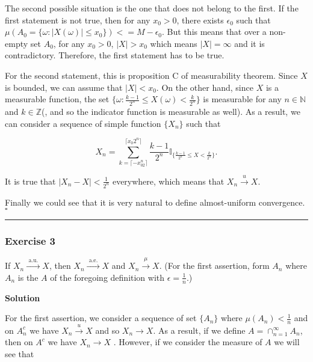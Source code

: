 \documentclass[
]{article}
\begin{document}
The second possible situation is the one that does not belong to the
first. If the first statement is not true, then for any \(x_0 > 0\),
there exists \(\epsilon_0\) such that
\(\mu(A_0 = \{\omega: |X(\omega)| \le x_0\}) <= M - \epsilon_0\). But
this means that over a non-empty set \(A_0\), for any \(x_0 > 0\),
\(|X| > x_0\) which means \(|X| = \infty\) and it is contradictory.
Therefore, the first statement has to be true.

For the second statement, this is proposition
C\textquotesingle\textquotesingle{} of measurability theorem. Since
\(X\) is bounded, we can assume that \(|X| < x_0\). On the other hand,
since \(X\) is a measurable function, the set
\(\{\omega:  \frac{k-1}{2^n} \le X(\omega) < \frac{k}{2^n}\}\) is
measurable for any \(n\in \mathbb N\) and \(k \in \mathbb Z\)(, and so
the indicator function is measurable as well). As a result, we can
consider a sequence of simple function \(\{X_n\}\) such that

\[X_n = \sum_{k = \lceil -x_02^n\rceil }^{\lceil x_0 2^n \rceil } \frac{k-1}{2^n} \mathbb I_{\{\frac{k-1}{2^n} \le X < \frac{k}{2^n}\}}.\]

It is true that \(|X_n - X| < \frac{1}{2^n}\) everywhere, which means
that \(X_n \xrightarrow{u} X\).

Finally we could see that it is very natural to define almost-uniform
convergence. \(\square\)

\begin{center}\rule{0.5\linewidth}{0.5pt}\end{center}

\hypertarget{exercise-3-2}{%
  \subsubsection{Exercise 3}\label{exercise-3-2}}

If \(X_n \stackrel{\text { a.u. }}{\longrightarrow} X\), then
\(X_n \stackrel{\text { a.e. }}{\longrightarrow} X\) and
\(X_n \stackrel{\mu}{\longrightarrow} X\). (For the first assertion,
form \(A_n\) where \(A_n\) is the \(A\) of the foregoing definition with
\(\epsilon=\frac{1}{n}\).)

\textbf{Solution}

For the first assertion, we consider a sequence of set \(\{A_n\}\) where
\(\mu(A_n) < \frac{1}{n}\) and on \(A_n^c\) we have
\(X_n\xrightarrow{u} X\) and so \(X_n \to X\). As a result, if we define
\(A = \cap_{n=1}^\infty A_n\), then on \(A^c\) we have \(X_n\to X\) .
However, if we consider the measure of \(A\) we will see that
\end{document}
